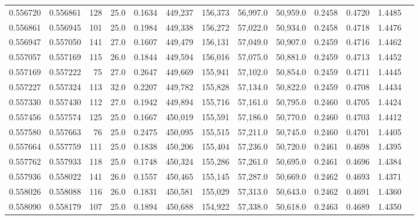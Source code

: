 \begin{tabular}{rrrrrrrrrrrrr}
0.556720 & 0.556861 &   128 & 25.0 &                                     0.1634 & 449,237 & 156,373 &  56,997.0 &  50,959.0 & 0.2458 & 0.4720 & 1.4485 \\
0.556861 & 0.556945 &   101 & 25.0 &                                     0.1984 & 449,338 & 156,272 &  57,022.0 &  50,934.0 & 0.2458 & 0.4718 & 1.4476 \\
0.556947 & 0.557050 &   141 & 27.0 &                                     0.1607 & 449,479 & 156,131 &  57,049.0 &  50,907.0 & 0.2459 & 0.4716 & 1.4462 \\
0.557057 & 0.557169 &   115 & 26.0 &                                     0.1844 & 449,594 & 156,016 &  57,075.0 &  50,881.0 & 0.2459 & 0.4713 & 1.4452 \\
0.557169 & 0.557222 &    75 & 27.0 &                                     0.2647 & 449,669 & 155,941 &  57,102.0 &  50,854.0 & 0.2459 & 0.4711 & 1.4445 \\
0.557227 & 0.557324 &   113 & 32.0 &                                     0.2207 & 449,782 & 155,828 &  57,134.0 &  50,822.0 & 0.2459 & 0.4708 & 1.4434 \\
0.557330 & 0.557430 &   112 & 27.0 &                                     0.1942 & 449,894 & 155,716 &  57,161.0 &  50,795.0 & 0.2460 & 0.4705 & 1.4424 \\
0.557456 & 0.557574 &   125 & 25.0 &                                     0.1667 & 450,019 & 155,591 &  57,186.0 &  50,770.0 & 0.2460 & 0.4703 & 1.4412 \\
0.557580 & 0.557663 &    76 & 25.0 &                                     0.2475 & 450,095 & 155,515 &  57,211.0 &  50,745.0 & 0.2460 & 0.4701 & 1.4405 \\
0.557664 & 0.557759 &   111 & 25.0 &                                     0.1838 & 450,206 & 155,404 &  57,236.0 &  50,720.0 & 0.2461 & 0.4698 & 1.4395 \\
0.557762 & 0.557933 &   118 & 25.0 &                                     0.1748 & 450,324 & 155,286 &  57,261.0 &  50,695.0 & 0.2461 & 0.4696 & 1.4384 \\
0.557936 & 0.558022 &   141 & 26.0 &                                     0.1557 & 450,465 & 155,145 &  57,287.0 &  50,669.0 & 0.2462 & 0.4693 & 1.4371 \\
0.558026 & 0.558088 &   116 & 26.0 &                                     0.1831 & 450,581 & 155,029 &  57,313.0 &  50,643.0 & 0.2462 & 0.4691 & 1.4360 \\
0.558090 & 0.558179 &   107 & 25.0 &                                     0.1894 & 450,688 & 154,922 &  57,338.0 &  50,618.0 & 0.2463 & 0.4689 & 1.4350 \\

\end{tabular}
